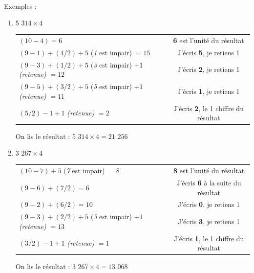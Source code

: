 \documentclass[a4paper]{article}
\begin{document}
\vspace{-2 mm}

{ \parindent=0.5cm Exemples : }

\begin{small}
\begin{enumerate}

	\item $5$ $314 \times 4$
	
	\begin{tabular}{l|c}
	
		$(10 - 4) = 6$ & \textbf{6} est l'unité du résultat
		
		\tabularnewline
		
		$(9 - 1) + (4 / 2) + 5$ (\textit{1} est impair) $= 15$ & J'écris \textbf{5}, je retiens 1
		
		\tabularnewline
		
		$(9 - 3) + (1 / 2) + 5$ (\textit{3} est impair) $+ 1$ \textit{(retenue)} $= 12$ & J'écris \textbf{2}, je retiens 1
		
		\tabularnewline
		
		$(9 - 5) + (3 / 2) + 5$ (\textit{5} est impair) $+ 1$ \textit{(retenue)} $= 11$ & J'écris \textbf{1}, je retiens 1 
		
		\tabularnewline
		
		$(5 / 2) - 1 + 1$ \textit{(retenue)} $= 2$ & J'écris \textbf{2}, le 1\up{er} chiffre du résultat
		
		
	\end{tabular}
	
	On lis le résultat : {\boldmath$5$ $314 \times 4 = 21$ $256$}\\


\smallskip

	\item $3$ $267 \times 4$
	
	\begin{tabular}{l|c}
	
		$(10 - 7) + 5$ (\textit{7} est impair) $= 8$ & \textbf{8} est l'unité du résultat
		
		\tabularnewline
		
		$(9 - 6) + (7 / 2) = 6$ & J'écris \textbf{6} à la suite du résultat
		
		\tabularnewline
		
		$(9 - 2) + (6 / 2) = 10$ & J'écris \textbf{0}, je retiens 1
		
		\tabularnewline
		
		$(9 - 3) + (2 / 2) + 5$ (\textit{3} est impair) $+ 1$ \textit{(retenue)} $= 13$ & J'écris \textbf{3}, je retiens 1 
		
		\tabularnewline
		
		$(3 / 2) - 1 + 1$ \textit{(retenue)} $= 1$ & J'écris \textbf{1}, le 1\up{er} chiffre du résultat
		
	\end{tabular}
	
	On lis le résultat : {\boldmath $3$ $267 \times 4 = 13$ $068$}\\

\end{enumerate}
\end{small}
\end{document}
